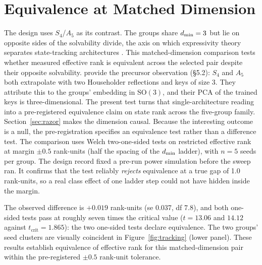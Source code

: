 \section{Equivalence at Matched Dimension}
\label{sec:equivalence}

The design uses $S_4$/$A_5$ as its contrast. The groups share $d_{\min} = 3$ but
lie on opposite sides of the solvability divide, the axis on which expressivity
theory separates state-tracking architectures
\citep{merrill2024illusion, grazzi2025negative,
siems2025deltaproduct}. This matched-dimension comparison tests whether
measured effective rank is equivalent across the selected pair despite
their opposite solvability. \citet{siems2025deltaproduct} provide the
precursor observation (\S5.2): $S_4$ and $A_5$ both extrapolate with two
Householder reflections and keys of size 3. They attribute this to the groups'
embedding in $\mathrm{SO}(3)$, and their PCA of the trained keys is
three-dimensional. The present test turns that single-architecture reading
into a pre-registered equivalence claim on state rank across the five-group
family. Section~\ref{sec:razor} makes the dimension causal. Because the
interesting outcome is a null, the pre-registration specifies an equivalence
test rather than a difference test. The comparison uses Welch two-one-sided
tests on restricted effective rank at margin $\pm 0.5$ rank-units (half the
spacing of the $d_{\min}$ ladder), with $n = 5$ seeds per group. The design record
fixed a pre-run power simulation before the sweep ran. It confirms that the
test reliably \emph{rejects} equivalence at a true gap of 1.0 rank-units, so a
real class effect of one ladder step could not have hidden inside the margin.

The observed difference is $+0.019$ rank-units (se 0.037, df 7.8), and
both one-sided tests pass at roughly seven times the critical value
($t = 13.06$ and $14.12$ against $t_{\mathrm{crit}} = 1.865$): the two
one-sided tests declare equivalence.
The two groups' seed clusters are visually coincident in
Figure~\ref{fig:tracking} (lower panel). These results establish
equivalence of effective rank for this matched-dimension pair within the
pre-registered $\pm 0.5$ rank-unit tolerance.
